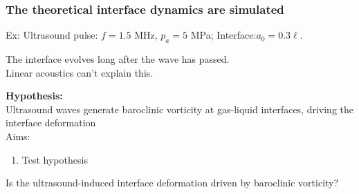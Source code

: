 % 
% 


% 
% 
\begin{frame}
  \frametitle{\vspace*{0.25cm} The theoretical interface dynamics are simulated}
  \vspace*{0.5cm}
  Ex: Ultrasound pulse: $f=1.5$ MHz, $p_a=5$ MPa; Interface:$a_0=0.3\ell$.
  \begin{figure}
    \centering
    \begin{subfigure}[b]{0.9\textwidth}
    \end{subfigure}
  \end{figure}
  \begin{center}
    \begin{minipage}{0.75\linewidth}
      The interface evolves long after the wave has passed.\vspace*{0.25cm}\\%
      Linear acoustics can't explain this.
    \end{minipage}
  \end{center}
\end{frame}
% 
% 
\begin{frame}
  \vfill
  \textbf{Hypothesis:}\\Ultrasound waves generate baroclinic vorticity at gas-liquid interfaces, driving the interface deformation\\
  \vfill
  Aims:
  \begin{enumerate}
  \item Test hypothesis \vspace{0.25cm}%
  \end{enumerate}
  \vfill
  \pause
  {\Large Is the ultrasound-induced interface deformation driven by baroclinic vorticity?}
  \vfill
\end{frame}
